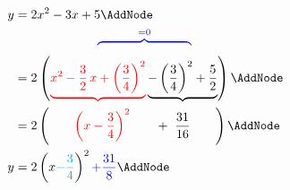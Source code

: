 \documentclass[a4paper,11pt]{article}
\begin{document}
\begin{NodesList}[margin=1cm]
  \begin{displaymath}\displaywidth=.2\linewidth
    \begin{aligned}
    y &= 2x^2 -3x +5                          \AddNode\\
  & \hphantom{= \ 2\left(x^2-\frac{3}{2}\,x\right. }%
      \textcolor{blue}{%
        \overbrace{\hphantom{+\left(\frac{3}{4}\right)^2- %
          \left(\frac{3}{4}\right)^2}}^{=0}}   \\
  &= 2\left(\textcolor{red}{%
       \underbrace{%
           x^2-\frac{3}{2}\,x + \left(\frac{3}{4}\right)^2}%
   }%
   \underbrace{%
        - \left(\frac{3}{4}\right)^2 + \frac{5}{2}}%
   \right)                                      \AddNode\\
   &= 2\left(\qquad\textcolor{red}{\left(x-\frac{3}{4}\right)^2}
   \qquad + \ \frac{31}{16}\qquad\right)  \AddNode\\
y
   &= 2\left(x\textcolor{cyan}{-\frac{3}{4}}\right)^2\textcolor{blue}{+\frac{31}{8}}\AddNode
\end{aligned}
         \end{displaymath}
{%
}
\end{NodesList}
\end{document}
